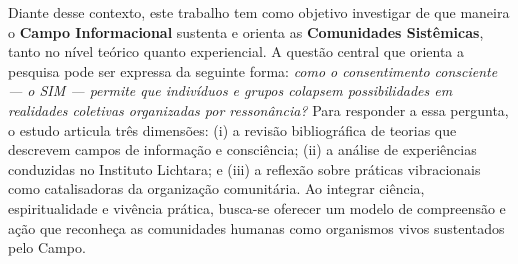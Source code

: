 Diante desse contexto, este trabalho tem como objetivo investigar de que maneira o \textbf{Campo Informacional} sustenta e orienta as \textbf{Comunidades Sistêmicas}, tanto no nível teórico quanto experiencial. A questão central que orienta a pesquisa pode ser expressa da seguinte forma: \textit{como o consentimento consciente — o SIM — permite que indivíduos e grupos colapsem possibilidades em realidades coletivas organizadas por ressonância?} Para responder a essa pergunta, o estudo articula três dimensões: (i) a revisão bibliográfica de teorias que descrevem campos de informação e consciência; (ii) a análise de experiências conduzidas no Instituto Lichtara; e (iii) a reflexão sobre práticas vibracionais como catalisadoras da organização comunitária. Ao integrar ciência, espiritualidade e vivência prática, busca-se oferecer um modelo de compreensão e ação que reconheça as comunidades humanas como organismos vivos sustentados pelo Campo.

\newpage
